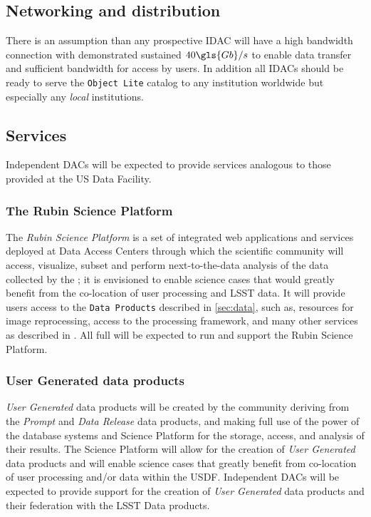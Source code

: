 \subsection{Networking and distribution}
There is an assumption than any prospective \gls{IDAC} will have a high bandwidth connection with demonstrated sustained $40 \gls{Gb}/s$ to enable data transfer and sufficient bandwidth for access by users.
In addition all IDACs should be ready  to serve the {\tt \gls{Object} Lite} catalog to any institution worldwide but especially any {\em local} institutions.

\subsection{Services}

Independent DACs will be expected to provide services analogous to those provided at the \gls{US} Data Facility.

\subsubsection{The Rubin \gls{Science Platform}}

The {\it Rubin \gls{Science Platform}}   is a set of integrated web applications and services deployed at  \RO Data Access Centers through which the scientific community will access, visualize, subset and perform next-to-the-data analysis of the data collected by the \RO; it is envisioned to enable science cases that would greatly benefit from the co-location of user processing and \gls{LSST} data. It will provide users access to the {\tt Data Products} described in \ref{sec:data}, such as, resources for image reprocessing, access to the \RO processing framework, and many other services as described in .  All full  will be expected to run and support the Rubin \gls{Science Platform}.

\subsubsection{User Generated data products }

{\it User Generated} data products will be created by the community deriving from the {\it Prompt} and {\it \gls{Data Release}} data products, and making  full use of the power of the \RO database systems and
Science Platform for the storage, access, and analysis of their results.
The \gls{Science Platform} will allow for the creation of {\it User Generated} data products and will enable science cases that greatly benefit from co-location of user processing and/or data within the USDF.  Independent DACs will be expected to provide support for the creation of {\it User Generated} data products and their federation with the \gls{LSST} Data products.

